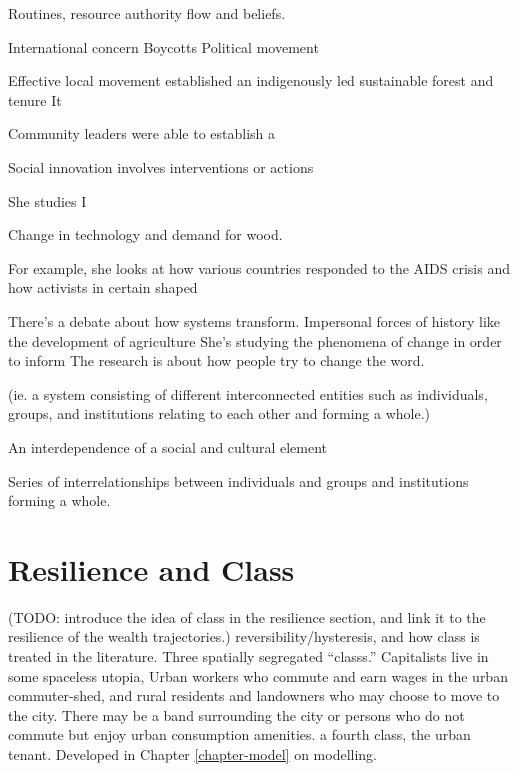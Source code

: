 Routines, resource authority flow and beliefs. 

International concern
Boycotts 
Political movement

Effective local movement established an indigenously led sustainable forest and tenure
It 



Community leaders were able to establish a 




Social innovation involves interventions or actions 




She studies I

Change in technology and demand for wood. 

For example, she looks at how various countries responded to the AIDS crisis and how activists in certain shaped 

There’s a debate about how systems transform. 
Impersonal forces of history like the development of agriculture
She’s studying the phenomena of change in order to inform 
The research is about how people try to change the word. 

(ie. a system consisting of different interconnected entities such as  individuals, groups, and institutions relating to each other and forming a whole.)

An interdependence of a social and cultural element 

Series of interrelationships between individuals and groups and institutions forming a whole. 





\section{Resilience and Class}

(TODO: introduce the idea of class in the resilience section, and link it to the resilience of the wealth trajectories.)  
reversibility/hysteresis, and how class is treated in the literature.
Three spatially segregated ``\glspl{class}.'' Capitalists live in some spaceless utopia,  Urban workers who commute and earn wages in the urban commuter-shed, and  rural residents and landowners who may choose to move to the city. There may be a band surrounding the city or persons who do not commute but enjoy urban consumption amenities. 
a fourth class, the urban tenant. 
Developed in Chapter \ref{chapter-model} on modelling.

